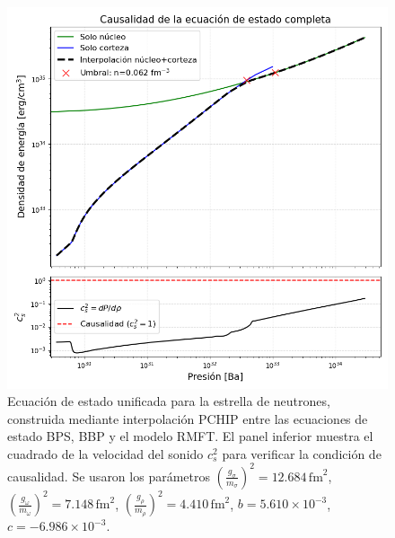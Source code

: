 \begin{figure}[h]
	\centering
	\includegraphics[width=0.7\linewidth]{Figuras/causalidad_materia_estelar_completa}
	\caption[Ecuación de estado unificada y causalidad.]{Ecuación de estado unificada para la estrella de neutrones, construida mediante interpolación PCHIP entre las ecuaciones de estado BPS, BBP y el modelo RMFT. El panel inferior muestra el cuadrado de la velocidad del sonido $c_s^2$ para verificar la condición de causalidad. Se usaron los parámetros $\left(\frac{g_\sigma}{m_\sigma}\right)^2=12.684\,\text{fm}^2$, $\left(\frac{g_\omega}{m_\omega}\right)^2=7.148\,\text{fm}^2$, $\left(\frac{g_\rho}{m_\rho}\right)^2=4.410\,\text{fm}^2$, $b=5.610\times10^{-3}$, $c=-6.986\times10^{-3}$.}
	\label{fig:causalidadmateriabase}
\end{figure}

